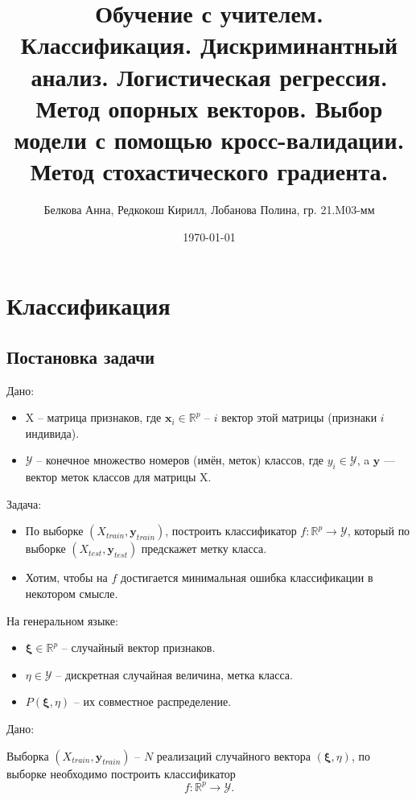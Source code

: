 \documentclass{article}
\title{Обучение с учителем. Классификация. Дискриминантный анализ. Логистическая регрессия. Метод опорных векторов. Выбор модели с помощью кросс-валидации. Метод стохастического градиента.}
\author{Белкова Анна, Редкокош Кирилл, Лобанова Полина, гр. 21.M03-мм}
\date{\today}
\begin{document}
	\maketitle
	\tableofcontents
	\newpage
	
	\section{Классификация}
	\subsection{Постановка задачи}

Дано:
    \begin{itemize}
        \item X -- матрица признаков, где $\boldsymbol{x}_i \in \mathbb{R}^p$ -- $i$ вектор этой матрицы (признаки $i$ индивида).
        \item $\mathcal{Y}$ -- конечное множество номеров (имён, меток) классов, где  $y_i \in \mathcal{Y}$, a $\boldsymbol{y}$ --- вектор меток классов для матрицы X.
    \end{itemize}

Задача:
\begin{itemize}

\item По выборке $(X_{train},\boldsymbol{y}_{train})$, построить классификатор $f:\mathbb{R}^p\to \mathcal{Y}$, который по выборке $(X_{test},\boldsymbol{y}_{test})$ предскажет метку класса.

       \item Хотим, чтобы на $f$ достигается минимальная ошибка классификации в некотором смысле.
\end{itemize} 

На генеральном языке:
    \begin{itemize}
        \item $\boldsymbol{\xi}\in\mathbb{R}^p$ -- случайный вектор признаков.
        \item $\eta\in\mathcal{Y}$ -- дискретная случайная величина, метка класса.
        \item $P(\boldsymbol{\xi},\eta)$ -- их совместное распределение.
    \end{itemize}
    
Дано:

Выборка $(X_{train},\boldsymbol{y}_{train})$ -- $N$ реализаций случайного вектора $(\boldsymbol{\xi},\eta)$, по выборке необходимо построить классификатор $$f:\mathbb{R}^p\to \mathcal{Y}.$$
\end{document}
